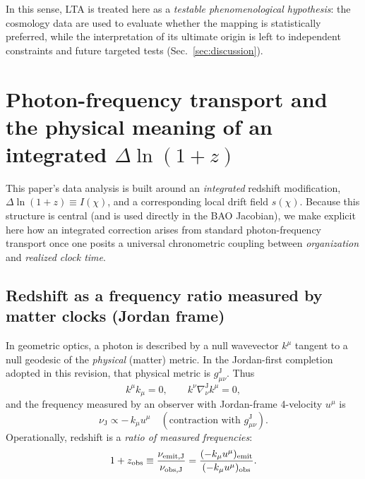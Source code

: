 \documentclass[10pt]{article}
\newcommand{\gJ}{g^{\mathrm{J}}}        %
\begin{document}
In this sense, LTA is treated here as a \emph{testable phenomenological hypothesis}: the cosmology
data are used to evaluate whether the mapping is statistically preferred, while the interpretation
of its ultimate origin is left to independent constraints and future targeted tests
(Sec.~\ref{sec:discussion}).

\section{Photon-frequency transport and the physical meaning of an integrated $\Delta\ln(1+z)$}
\label{sec:photon_transport}

This paper’s data analysis is built around an \emph{integrated} redshift modification,
\(\Delta\ln(1+z)\equiv I(\chi)\), and a corresponding local drift field \(s(\chi)\).
Because this structure is central (and is used directly in the BAO Jacobian), we make explicit here
how an integrated correction arises from standard photon-frequency transport once one posits a
universal chronometric coupling between \emph{organization} and \emph{realized clock time}.

\subsection{Redshift as a frequency ratio measured by matter clocks (Jordan frame)}
\label{sec:photon_transport_gr}

In geometric optics, a photon is described by a null wavevector \(k^\mu\) tangent to a null geodesic
of the \emph{physical} (matter) metric. In the Jordan-first completion adopted in this revision,
that physical metric is \(\gJ_{\mu\nu}\). Thus
\begin{equation}
k^\mu k_\mu = 0,
\qquad
k^\nu \nabla^{\mathrm{J}}_\nu k^\mu = 0,
\end{equation}
and the frequency measured by an observer with Jordan-frame 4-velocity \(u^\mu\) is
\begin{equation}
\nu_{\mathrm{J}} \propto -\,k_\mu u^\mu \quad (\text{contraction with } \gJ_{\mu\nu}).
\label{eq:nu_gr_def}
\end{equation}
Operationally, redshift is a \emph{ratio of measured frequencies}:
\begin{equation}
1+z_{\rm obs} \equiv \frac{\nu_{\rm emit,J}}{\nu_{\rm obs,J}}
= \frac{(-k_\mu u^\mu)_{\rm emit}}{(-k_\mu u^\mu)_{\rm obs}}.
\label{eq:z_gr_ratio}
\end{equation}
\end{document}
